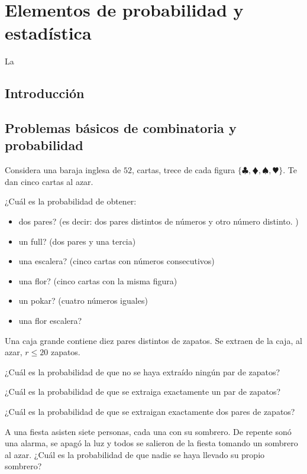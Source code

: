 
\chapter{Elementos de probabilidad y estadística}

La 

\section{Introducción}

\section{Problemas básicos de combinatoria y probabilidad}

\begin{ejercicio}
Considera una baraja inglesa de $52$, cartas, trece de cada figura $\{\clubsuit
,\vardiamondsuit,\spadesuit,\varheartsuit\}$. 
Te dan cinco cartas al azar. 
\vspace{.3cm}


¿Cuál es la probabilidad de obtener:

\begin{itemize}
\item dos pares? (es decir: dos pares distintos de números y otro número distinto. )
\item un full? (dos pares y una tercia)
\item una escalera? (cinco cartas con números consecutivos)
\item una flor? (cinco cartas con la misma figura)
\item un pokar? (cuatro números iguales)
\item una flor escalera?
\end{itemize}
\end{ejercicio}


\begin{ejercicio}
Una caja grande contiene diez pares distintos de zapatos. Se extraen de la caja, al azar, $r\leq 20$ zapatos. 

¿Cuál es la probabilidad de que no se haya extraído ningún par de zapatos?

¿Cuál es la probabilidad de que se extraiga exactamente un par de zapatos?

¿Cuál es la probabilidad de que se extraigan exactamente dos pares de zapatos?
\end{ejercicio}


\begin{ejercicio}
A una fiesta asisten siete personas, cada una con su sombrero. De repente sonó una alarma, se apagó la luz y todos se salieron de la fiesta tomando un sombrero al azar. ¿Cuál es la probabilidad de que nadie se haya llevado su propio sombrero?
\end{ejercicio}


